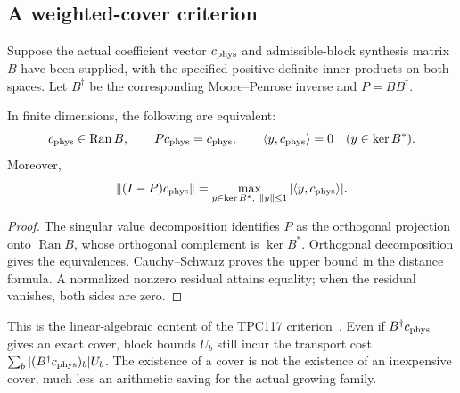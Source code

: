 \subsection{A weighted-cover criterion}
Suppose the actual coefficient vector $c_{\rm phys}$ and admissible-block synthesis matrix $B$ have been supplied, with the specified positive-definite inner products on both spaces. Let $B^\dagger$ be the corresponding Moore--Penrose inverse and $P=BB^\dagger$.
\begin{proposition}
In finite dimensions, the following are equivalent:
\[
c_{\rm phys}\in\operatorname{Ran}B,\qquad Pc_{\rm phys}=c_{\rm phys},\qquad
\langle y,c_{\rm phys}\rangle=0\quad(y\in\ker B^*).
\]
Moreover,
\[
\|(I-P)c_{\rm phys}\|=
\max_{y\in\ker B^*,\ \|y\|\le1}|\langle y,c_{\rm phys}\rangle|.
\]
\end{proposition}
\begin{proof}
The singular value decomposition identifies $P$ as the orthogonal projection onto $\operatorname{Ran}B$, whose orthogonal complement is $\ker B^*$. Orthogonal decomposition gives the equivalences. Cauchy--Schwarz proves the upper bound in the distance formula. A normalized nonzero residual attains equality; when the residual vanishes, both sides are zero.
\end{proof}
This is the linear-algebraic content of the TPC117 criterion~\cite{archivestructure}. Even if $B^\dagger c_{\rm phys}$ gives an exact cover, block bounds $U_b$ still incur the transport cost
$\sum_b|(B^\dagger c_{\rm phys})_b|U_b$.
The existence of a cover is not the existence of an inexpensive cover, much less an arithmetic saving for the actual growing family.
